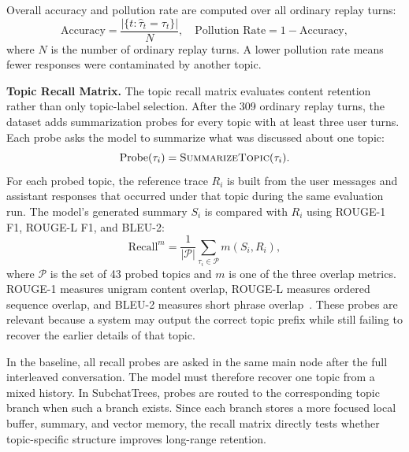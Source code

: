 \documentclass[pdflatex,sn-mathphys-num]{sn-jnl}%
\theoremstyle{thmstyleone}%
\theoremstyle{thmstyletwo}%
\theoremstyle{thmstylethree}%
\begin{document}
Overall accuracy and pollution rate are computed over all ordinary replay turns:
\begin{equation}
\text{Accuracy} = \frac{|\{t:\hat{\tau}_t=\tau_t\}|}{N}, \quad
\text{Pollution Rate} = 1-\text{Accuracy},
\label{eq:accuracy_pollution}
\end{equation}
where $N$ is the number of ordinary replay turns. A lower pollution rate means fewer responses were contaminated by another topic.

\textbf{Topic Recall Matrix.}
The topic recall matrix evaluates content retention rather than only topic-label selection. After the 309 ordinary replay turns, the dataset adds summarization probes for every topic with at least three user turns. Each probe asks the model to summarize what was discussed about one topic:
\begin{equation}
\operatorname{Probe}(\tau_i) = \textsc{SummarizeTopic}(\tau_i).
\label{eq:probe}
\end{equation}
For each probed topic, the reference trace $R_i$ is built from the user messages and assistant responses that occurred under that topic during the same evaluation run. The model's generated summary $S_i$ is compared with $R_i$ using ROUGE-1 F1, ROUGE-L F1, and BLEU-2:
\begin{equation}
\text{Recall}^{m} = \frac{1}{|\mathcal{P}|}\sum_{\tau_i \in \mathcal{P}} m(S_i, R_i),
\label{eq:recall_probe_agg}
\end{equation}
where $\mathcal{P}$ is the set of 43 probed topics and $m$ is one of the three overlap metrics. ROUGE-1 measures unigram content overlap, ROUGE-L measures ordered sequence overlap, and BLEU-2 measures short phrase overlap~\cite{lin2004rouge,papineni2002bleu}. These probes are relevant because a system may output the correct topic prefix while still failing to recover the earlier details of that topic.

In the baseline, all recall probes are asked in the same main node after the full interleaved conversation. The model must therefore recover one topic from a mixed history. In SubchatTrees, probes are routed to the corresponding topic branch when such a branch exists. Since each branch stores a more focused local buffer, summary, and vector memory, the recall matrix directly tests whether topic-specific structure improves long-range retention.
\end{document}
